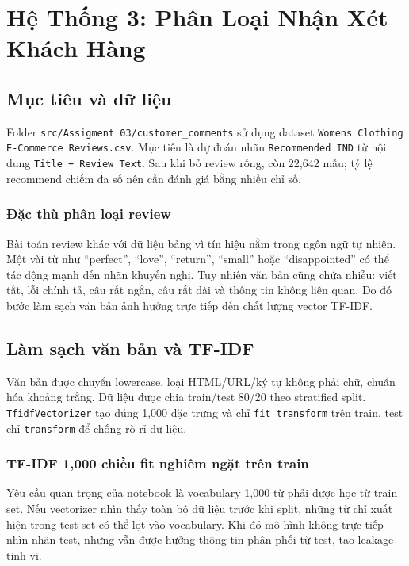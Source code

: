 \documentclass[12pt,a4paper]{report}
\newcommand{\modelpath}[1]{\texttt{#1}}
\begin{document}
\chapter{Hệ Thống 3: Phân Loại Nhận Xét Khách Hàng}

\section{Mục tiêu và dữ liệu}
Folder \modelpath{src/Assigment 03/customer\_comments} sử dụng dataset \modelpath{Womens Clothing E-Commerce Reviews.csv}. Mục tiêu là dự đoán nhãn \texttt{Recommended IND} từ nội dung \texttt{Title + Review Text}. Sau khi bỏ review rỗng, còn 22,642 mẫu; tỷ lệ recommend chiếm đa số nên cần đánh giá bằng nhiều chỉ số.

\subsection{Đặc thù phân loại review}
Bài toán review khác với dữ liệu bảng vì tín hiệu nằm trong ngôn ngữ tự nhiên.
Một vài từ như ``perfect'', ``love'', ``return'', ``small'' hoặc ``disappointed'' có thể tác động mạnh đến nhãn khuyến nghị.
Tuy nhiên văn bản cũng chứa nhiễu: viết tắt, lỗi chính tả, câu rất ngắn, câu rất dài và thông tin không liên quan.
Do đó bước làm sạch văn bản ảnh hưởng trực tiếp đến chất lượng vector TF-IDF.

\section{Làm sạch văn bản và TF-IDF}
Văn bản được chuyển lowercase, loại HTML/URL/ký tự không phải chữ, chuẩn hóa khoảng trắng. Dữ liệu được chia train/test 80/20 theo stratified split. \texttt{TfidfVectorizer} tạo đúng 1,000 đặc trưng và chỉ \texttt{fit\_transform} trên train, test chỉ \texttt{transform} để chống rò rỉ dữ liệu.

\subsection{TF-IDF 1,000 chiều fit nghiêm ngặt trên train}
Yêu cầu quan trọng của notebook là vocabulary 1,000 từ phải được học từ train set.
Nếu vectorizer nhìn thấy toàn bộ dữ liệu trước khi split, những từ chỉ xuất hiện trong test set có thể lọt vào vocabulary.
Khi đó mô hình không trực tiếp nhìn nhãn test, nhưng vẫn được hưởng thông tin phân phối từ test, tạo leakage tinh vi.
\end{document}

